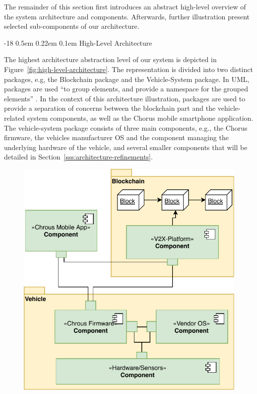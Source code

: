 \documentclass{llncs}
\makeatletter
\renewcommand\subsubsection{\@startsection{subsubsection}{3}{\z@}%
		{-18\p@ \@plus -4\p@ \@minus -4\p@}%
		{0.5em \@plus 0.22em \@minus 0.1em}%
		{\normalfont\normalsize\bfseries\boldmath}}
\makeatother
\begin{document}
{			The remainder of this section first introduces an abstract high-level overview of the system architecture and components. Afterwards, further illustration present selected sub-components of our architecture.



			\subsubsection{High-Level Architecture}
				\label{sss:high-level-architecture}
				
				The highest architecture abstraction level of our system is depicted in Figure~\ref{fig:high-level-architecture}. The representation is divided into two distinct packages, e.g, the Blockchain package and the Vehicle-System package. In UML, packages are used “to group elements, and provide a namespace for the grouped elements”  \cite{specification2007omg}. In the context of this architecture illustration, packages are used to provide a separation of concerns between the blockchain part and the vehicle-related system components, as well as the Chorus mobile smartphone application. The vehicle-system package consists of three main components, e.g., the Chorus firmware, the vehicles manufacturer OS and the component managing the underlying hardware of the vehicle, and several smaller components that will be detailed in Section~\ref{sss:architecture-refinements}.
				\begin{figure}
					\centering
					\includegraphics[scale=0.75]{Figures/longterm-architecture/20180507_high-level-architecture.pdf}

\end{figure}}
\end{document}
